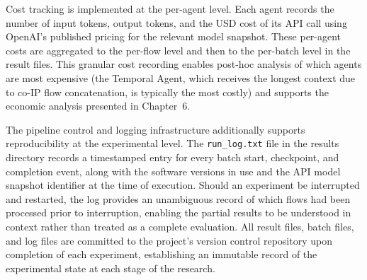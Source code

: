 \documentclass[../main.tex]{subfiles}
\begin{document}
Cost tracking is implemented at the per-agent level. Each agent records the number of input tokens, output tokens, and the USD cost of its API call using OpenAI's published pricing for the relevant model snapshot. These per-agent costs are aggregated to the per-flow level and then to the per-batch level in the result files. This granular cost recording enables post-hoc analysis of which agents are most expensive (the Temporal Agent, which receives the longest context due to co-IP flow concatenation, is typically the most costly) and supports the economic analysis presented in Chapter~6.

The pipeline control and logging infrastructure additionally supports reproducibility at the experimental level. The \texttt{run\_log.txt} file in the results directory records a timestamped entry for every batch start, checkpoint, and completion event, along with the software versions in use and the API model snapshot identifier at the time of execution. Should an experiment be interrupted and restarted, the log provides an unambiguous record of which flows had been processed prior to interruption, enabling the partial results to be understood in context rather than treated as a complete evaluation. All result files, batch files, and log files are committed to the project's version control repository upon completion of each experiment, establishing an immutable record of the experimental state at each stage of the research.

\onlystandalone{\printbibliography}
\end{document}
